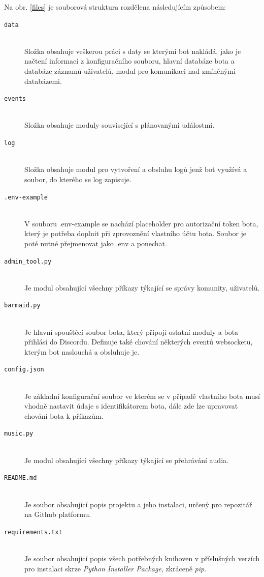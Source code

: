 \documentclass[
  program=inf,
biblatex=false,
sourcecodes=true,
joinlists=true,
  figures=true,
  tables=true,
  glossaries=true,
  index=false
]{kidiplom}
\begin{document}
Na obr. \ref{files} je souborová struktura rozdělena následujícím způsobem:

\begin{description}
  \item[\texttt{data}] \hfill \\
  Složka obsahuje veškerou práci s daty se kterými bot nakládá, jako je 
  načtení informací z konfiguračního souboru, hlavní databáze bota a databáze 
  záznamů uživatelů, modul pro komunikaci nad zmíněnými databázemi.

  \item[\texttt{events}] \hfill \\
  Složka obsahuje moduly související s plánovanými událostmi.

  \item[\texttt{log}] \hfill \\
  Složka obsahuje modul pro vytvoření a obsluhu logů jenž bot využívá a soubor, do kterého
  se log zapisuje.

  \item[\texttt{.env-example}] \hfill \\
  V souboru .env-example se nachází placeholder pro autorizační token bota, který je potřeba
  doplnit při zprovoznění vlastního účtu bota. Soubor je poté nutné přejmenovat jako .env a ponechat.

  \item[\texttt{admin\_tool.py}] \hfill \\
  Je modul obsahující všechny příkazy týkající se správy komunity, uživatelů.

  \item[\texttt{barmaid.py}] \hfill \\
  Je hlavní spouštěcí soubor bota, který připojí ostatní moduly a bota přihlásí do Discordu.
  Definuje také chování některých eventů websocketu, kterým bot naslouchá a obsluhuje je.

  \item[\texttt{config.json}] \hfill \\
  Je základní konfigurační soubor ve kterém se v případě vlastního bota musí 
  vhodně nastavit údaje s identifikátorem bota, dále zde lze upravovat chování bota
  k příkazům.

  \item[\texttt{music.py}] \hfill \\
  Je modul obsahující všechny příkazy týkající se přehrávání audia.

  \item[\texttt{README.md}] \hfill \\
  Je soubor obsahující popis projektu a jeho instalaci, určený pro repozitář na Github platformu.

  \item[\texttt{requirements.txt}] \hfill \\
  Je soubor obsahující popis všech potřebných knihoven v příslušných verzích pro
  instalaci skrze {\it Python Installer Package}, zkráceně {\it pip}.

\end{description}
\end{document}
